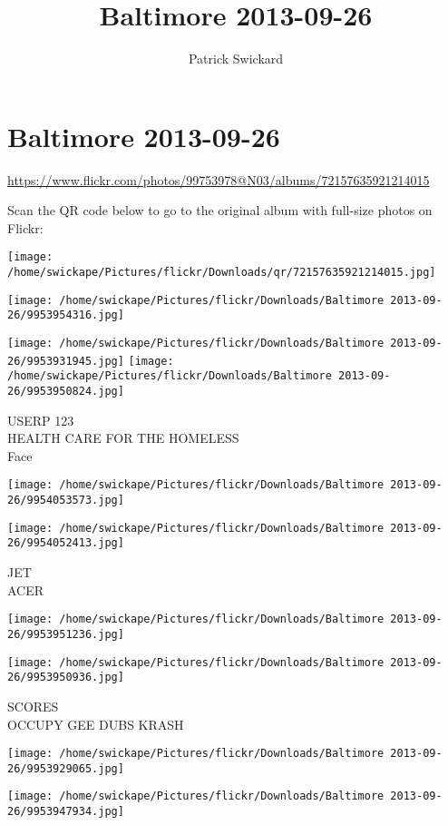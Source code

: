 \documentclass[10pt,letterpaper]{article}
\title{Baltimore 2013-09-26}
\author{Patrick Swickard}
\date{}
\begin{document}
\section*{Baltimore 2013-09-26}

\url{https://www.flickr.com/photos/99753978@N03/albums/72157635921214015}

Scan the QR code below to go to the original album with full-size photos on Flickr:

\texttt{[image: /home/swickape/Pictures/flickr/Downloads/qr/72157635921214015.jpg]}
\pagebreak

\texttt{[image: /home/swickape/Pictures/flickr/Downloads/Baltimore 2013-09-26/9953954316.jpg]}

\vspace{0.25in}
\texttt{[image: /home/swickape/Pictures/flickr/Downloads/Baltimore 2013-09-26/9953931945.jpg]}
\texttt{[image: /home/swickape/Pictures/flickr/Downloads/Baltimore 2013-09-26/9953950824.jpg]}

USERP 123\\
HEALTH CARE FOR THE HOMELESS\\
Face
\pagebreak

\texttt{[image: /home/swickape/Pictures/flickr/Downloads/Baltimore 2013-09-26/9954053573.jpg]}

\vspace{0.25in}
\texttt{[image: /home/swickape/Pictures/flickr/Downloads/Baltimore 2013-09-26/9954052413.jpg]}

JET\\
ACER
\pagebreak

\texttt{[image: /home/swickape/Pictures/flickr/Downloads/Baltimore 2013-09-26/9953951236.jpg]}

\vspace{0.25in}
\texttt{[image: /home/swickape/Pictures/flickr/Downloads/Baltimore 2013-09-26/9953950936.jpg]}

SCORES\\
OCCUPY GEE DUBS KRASH
\pagebreak

\texttt{[image: /home/swickape/Pictures/flickr/Downloads/Baltimore 2013-09-26/9953929065.jpg]}

\vspace{0.25in}
\texttt{[image: /home/swickape/Pictures/flickr/Downloads/Baltimore 2013-09-26/9953947934.jpg]}
\end{document}
